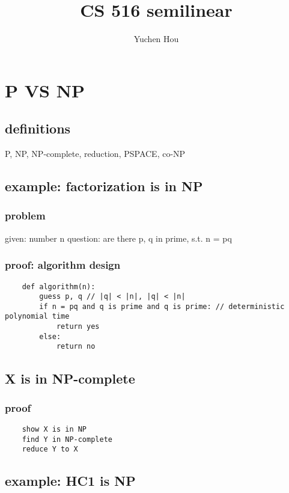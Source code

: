 \documentclass{article}
\begin{document}
\lstset{language=python, tabsize=4}
\title{CS 516 semilinear}
\author{Yuchen Hou}
\maketitle

\section{P VS NP}
\subsection{definitions}
P, NP, NP-complete, reduction, PSPACE, co-NP

\subsection{example: factorization is in NP}

\subsubsection{problem}
given: number n
question: are there p, q in prime, s.t. n = pq

\subsubsection{proof: algorithm design}

\begin{lstlisting}
	def algorithm(n):
		guess p, q // |q| < |n|, |q| < |n|
		if n = pq and q is prime and q is prime: // deterministic polynomial time
			return yes
		else:
			return no
\end{lstlisting}

\subsection{X is in NP-complete}

\subsubsection{proof}
\begin{lstlisting}
	show X is in NP
	find Y in NP-complete
	reduce Y to X
\end{lstlisting}

\subsection{example: HC1 is NP}
\end{document}
